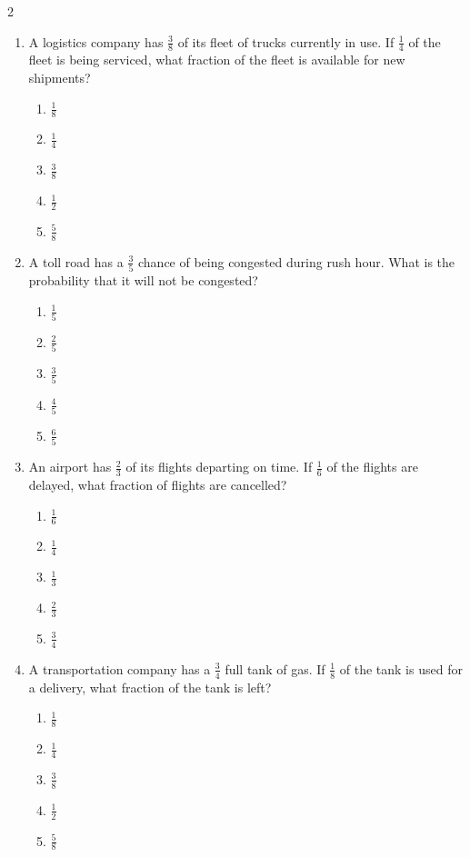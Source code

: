 \documentclass[10pt]{article}
\begin{document}
\begin{multicols}{2}
\begin{enumerate}[label=\textbf{Q\arabic*.}, leftmargin=*, itemsep=6pt, parsep=0pt]
  \item \small A logistics company has $\frac{3}{8}$ of its fleet of trucks currently in use. If $\frac{1}{4}$ of the fleet is being serviced, what fraction of the fleet is available for new shipments?
  \begin{enumerate}[label=(\Alph*), leftmargin=0.6cm, nosep, itemsep=2pt]
    \item $\frac{1}{8}$
    \item $\frac{1}{4}$
    \item $\frac{3}{8}$
    \item $\frac{1}{2}$
    \item $\frac{5}{8}$
  \end{enumerate}

  \item \small A toll road has a $\frac{3}{5}$ chance of being congested during rush hour. What is the probability that it will not be congested?
  \begin{enumerate}[label=(\Alph*), leftmargin=0.6cm, nosep, itemsep=2pt]
    \item $\frac{1}{5}$
    \item $\frac{2}{5}$
    \item $\frac{3}{5}$
    \item $\frac{4}{5}$
    \item $\frac{6}{5}$
  \end{enumerate}

  \item \small An airport has $\frac{2}{3}$ of its flights departing on time. If $\frac{1}{6}$ of the flights are delayed, what fraction of flights are cancelled?
  \begin{enumerate}[label=(\Alph*), leftmargin=0.6cm, nosep, itemsep=2pt]
    \item $\frac{1}{6}$
    \item $\frac{1}{4}$
    \item $\frac{1}{3}$
    \item $\frac{2}{3}$
    \item $\frac{3}{4}$
  \end{enumerate}

  \item \small A transportation company has a $\frac{3}{4}$ full tank of gas. If $\frac{1}{8}$ of the tank is used for a delivery, what fraction of the tank is left?
  \begin{enumerate}[label=(\Alph*), leftmargin=0.6cm, nosep, itemsep=2pt]
    \item $\frac{1}{8}$
    \item $\frac{1}{4}$
    \item $\frac{3}{8}$
    \item $\frac{1}{2}$
    \item $\frac{5}{8}$
  \end{enumerate}


\end{enumerate}
\end{multicols}
\end{document}
